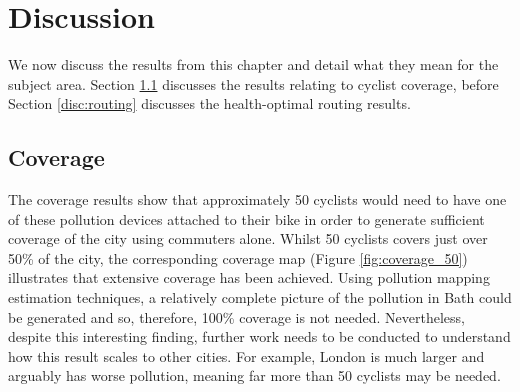 \documentclass[11pt,twosided,a4paper]{report}
\begin{document}
%
%

\section{Discussion}

We now discuss the results from this chapter and detail what they mean for the subject area. Section \ref{disc:coverage} discusses the results relating to cyclist coverage, before Section \ref{disc:routing} discusses the health-optimal routing results.

\subsection{Coverage} \label{disc:coverage}

The coverage results show that approximately 50 cyclists would need to have one of these pollution devices attached to their bike in order to generate sufficient coverage of the city using commuters alone. Whilst 50 cyclists covers just over 50\% of the city, the corresponding coverage map (Figure \ref{fig:coverage_50}) illustrates that extensive coverage has been achieved. Using pollution mapping estimation techniques, a relatively complete picture of the pollution in Bath could be generated and so, therefore, 100\% coverage is not needed. Nevertheless, despite this interesting finding, further work needs to be conducted to understand how this result scales to other cities. For example, London is much larger and arguably has worse pollution, meaning far more than 50 cyclists may be needed.
\end{document}
